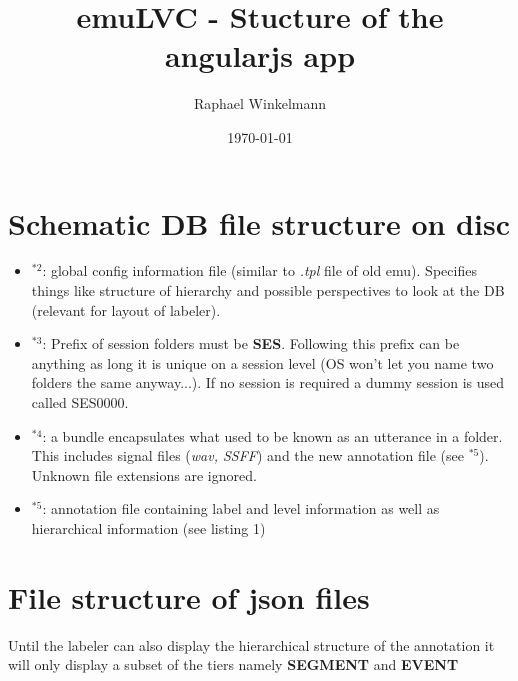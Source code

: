 \documentclass[A4,12pt, utf8]{article}
\title{emuLVC - Stucture of the angularjs app}
\author{Raphael Winkelmann}
\date{\today}
\newcounter{treeline}
\newcommand{\treeroot}[1]{%
\node[above] at (0,0) {#1};%
\setcounter{treeline}{0}
}
\newcommand{\altentry}[2]{%
\draw[->] (#2-1,-\value{treeline}/2) -- (#2-1,-\value{treeline}/2-0.5) -- (#2+0.5,-\value{treeline}/2-0.5) node[right] {#1};
\foreach \x in {1,...,#2}
{   \draw (\x-1,-\value{treeline}/2) -- (\x-1,-\value{treeline}/2-0.5);
}
\stepcounter{treeline}
}
\begin{document}

\section{Schematic DB file structure on disc}



\begin{itemize}
  \item $^{*2}$: global config information file (similar to \textit{.tpl} file of old emu). Specifies things like structure of hierarchy and possible perspectives to look at the DB (relevant for layout of labeler).
  \item $^{*3}$: Prefix of session folders must be \textbf{SES}. Following this prefix can be anything as long it is unique on a session level (OS won't let you name two folders the same anyway...). If no session is required a dummy session is used called SES0000.
  \item $^{*4}$: a bundle encapsulates what used to be known as an utterance in a folder. This includes signal files (\textit{wav, SSFF}) and the new annotation file (see $^{*5}$). Unknown file extensions are ignored.
  \item $^{*5}$: annotation file containing label and level information as well as hierarchical information (see listing 1)
\end{itemize}




\section{File structure of json files}

Until the labeler can also display the hierarchical structure of the annotation it will only 
display a subset of the tiers namely \textbf{SEGMENT} and \textbf{EVENT}
\end{document}
